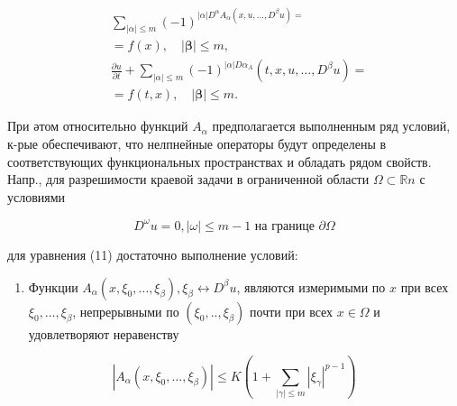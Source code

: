\documentclass[10pt]{article}
\begin{document}
\[

\begin{aligned}

& \sum_{|\alpha| \leqslant m}(-1)^{|\alpha| D^{\alpha} A_{\alpha}\left(x, u, \ldots, D^{\beta} u\right)=} \\

& =f(x), \quad|\boldsymbol{\beta}| \leqslant m \text {, } \\

& \frac{\partial u}{\partial t}+\sum_{|\alpha| \leqslant m}(-1)^{|\alpha| D \alpha_{A}}\left(t, x, u, \ldots, D^{\beta} u\right)= \\

& =f(t, x), \quad|\boldsymbol{\beta}| \leqslant m .

\end{aligned}

\]



При әтом относительно функций $A_{\alpha}$ предполагается выполненным ряд условий, к-рые обеспечивают, что нелпнейные операторы будут определены в соответствующих функциональных пространствах и обладать рядом свойств. Напр., для разрешимости краевой задачи в ограниченной области $\Omega \subset \mathbb{R} n$ с условиями



\[

D^{\omega} u=0,|\omega| \leqslant m-1 \text { на границе } \partial \Omega

\]



для уравнения (11) достаточно выполнение условий:



\begin{enumerate}

  \item Функции $A_{\alpha}\left(x, \xi_{0}, \ldots, \xi_{\beta}\right), \xi_{\beta} \leftrightarrow D^{\beta} u$, являются измеримыми по $x$ при всех $\xi_{0}, \ldots, \xi_{\beta}$, непрерывными по $\left(\xi_{0}, . ., \xi_{\beta}\right)$ почти при всех $x \in \Omega$ и удовлетворяют неравенству

\end{enumerate}



\[

\left|A_{\alpha}\left(x, \xi_{0}, \ldots, \xi_{\beta}\right)\right| \leqslant K\left(1+\sum_{|\gamma| \leqslant m}\left|\xi_{\gamma}\right|^{p-1}\right)

\]
\end{document}
